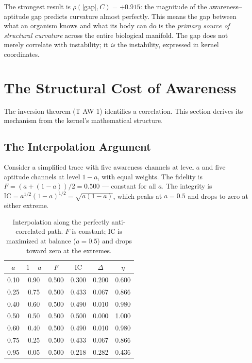\documentclass[
  aps,
  prd,
  twocolumn,
  superscriptaddress,
  nofootinbib,
  floatfix
]{revtex4-2}
\newcommand{\IC}{\mathrm{IC}}
\begin{document}
The strongest result is $\rho(|\mathrm{gap}|, C) = +0.915$:
the magnitude of the awareness--aptitude gap predicts
curvature almost perfectly.  This means the gap between
what an organism knows and what its body can do is the
\emph{primary source of structural curvature} across the
entire biological manifold.  The gap does not merely
correlate with instability; it \emph{is} the instability,
expressed in kernel coordinates.

\section{The Structural Cost of Awareness}\label{sec:cost}

The inversion theorem (T-AW-1) identifies a correlation.
This section derives its mechanism from the kernel's
mathematical structure.

\subsection{The Interpolation Argument}

Consider a simplified trace with five awareness channels at
level $a$ and five aptitude channels at level $1-a$, with
equal weights.  The fidelity is $F = (a + (1-a))/2 = 0.500$
--- constant for all $a$.  The integrity is
$\IC = a^{1/2}(1-a)^{1/2} = \sqrt{a(1-a)}$, which peaks at
$a = 0.5$ and drops to zero at either extreme.

\begin{table}[h]
\caption{\label{tab:interpolation}Interpolation along the
perfectly anti-correlated path.  $F$ is constant;
$\IC$ is maximized at balance ($a = 0.5$) and drops
toward zero at the extremes.}
\begin{ruledtabular}
\begin{tabular}{cccccc}
$a$ & $1\!-\!a$ & $F$ & $\IC$ & $\Delta$ & $\eta$ \\
\hline
0.10 & 0.90 & 0.500 & 0.300 & 0.200 & 0.600 \\
0.25 & 0.75 & 0.500 & 0.433 & 0.067 & 0.866 \\
0.40 & 0.60 & 0.500 & 0.490 & 0.010 & 0.980 \\
0.50 & 0.50 & 0.500 & 0.500 & 0.000 & 1.000 \\
0.60 & 0.40 & 0.500 & 0.490 & 0.010 & 0.980 \\
0.75 & 0.25 & 0.500 & 0.433 & 0.067 & 0.866 \\
0.95 & 0.05 & 0.500 & 0.218 & 0.282 & 0.436 \\
\end{tabular}
\end{ruledtabular}
\end{table}
\end{document}
